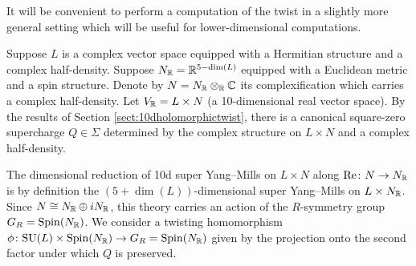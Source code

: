 \documentclass[10pt, oneside]{article}
\renewcommand{\Re}{\mathrm{Re}}
\begin{document}
It will be convenient to perform a computation of the twist in a slightly more general setting which will be useful for lower-dimensional computations.

Suppose $L$ is a complex vector space equipped with a Hermitian structure and a complex half-density. Suppose $N_\mathbb R=\mathbb R^{5-\dim(L)}$ equipped with a Euclidean metric and a spin structure. Denote by $N=N_\mathbb R\otimes_\mathbb R\mathbb C$ its complexification which carries a complex half-density. Let $V_\mathbb R = L\times N$ (a 10-dimensional real vector space). By the results of Section \ref{sect:10dholomorphictwist}, there is a canonical square-zero supercharge $Q\in\Sigma$ determined by the complex structure on $L\times N$ and a complex half-density.

The dimensional reduction of 10d super Yang--Mills on $L\times N$ along $\Re\colon N\rightarrow N_\RR$ is by definition the $(5+\dim(L))$-dimensional super Yang--Mills on $L\times N_\mathbb R$. Since $N\cong N_\mathbb R\oplus iN_\mathbb R$, this theory carries an action of the $R$-symmetry group $G_R=\mathrm{Spin}(N_\mathbb R)$. We consider a twisting homomorphism $\phi\colon \mathrm{SU}(L)\times \mathrm{Spin}(N_\mathbb R)\rightarrow G_R=\mathrm{Spin}(N_\mathbb R)$ given by the projection onto the second factor under which $Q$ is preserved.
\end{document}
